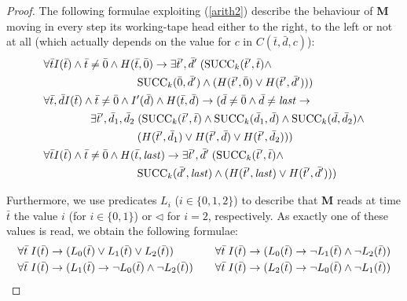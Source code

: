\documentclass{article}
\begin{document}
\begin{proof}
The following formulae exploiting (\ref{arith2}) describe the behaviour of \textbf{M} moving in every step its working-tape head either to the right, to the left or not at all (which actually depends on the value for $c$ in $C(\bar{t},\bar{d},c)$):
\begin{align}
& \forall \bar{t} I(\bar{t}) \wedge \bar{t} \neq \bar{0} \wedge H(\bar{t},\bar{0}) \rightarrow
\exists \bar{t}^\prime, \bar{d}^\prime \; ( \mathrm{SUCC}_k(\bar{t}^\prime,\bar{t}) \wedge \notag \\
& \hspace*{3cm} \mathrm{SUCC}_k(\bar{0},\bar{d}^\prime) \wedge ( H(\bar{t}^\prime,\bar{0}) \vee H(\bar{t}^\prime,\bar{d}^\prime) ) ) \notag \\
& \forall \bar{t}, \bar{d} I(\bar{t}) \wedge \bar{t} \neq \bar{0} \wedge I^\prime(\bar{d}) \wedge H(\bar{t},\bar{d}) \rightarrow ( \bar{d} \neq \bar{0} \wedge \bar{d} \neq \mathit{last} \rightarrow \notag \\
& \hspace*{1.5cm} \exists \bar{t}^\prime, \bar{d}_1 , \bar{d}_2 \; ( \mathrm{SUCC}_k(\bar{t}^\prime,\bar{t}) \wedge \mathrm{SUCC}_k(\bar{d}_1,\bar{d}) \wedge \mathrm{SUCC}_k(\bar{d},\bar{d}_2) \wedge \notag \\
& \hspace*{3cm}  ( H(\bar{t}^\prime,\bar{d}_1) \vee H(\bar{t}^\prime,\bar{d}) \vee H(\bar{t}^\prime,\bar{d}_2) ) ) \notag \\
& \forall \bar{t} I(\bar{t}) \wedge \bar{t} \neq \bar{0} \wedge H(\bar{t},\mathit{last}) \rightarrow
\exists \bar{t}^\prime, \bar{d}^\prime \; ( \mathrm{SUCC}_k(\bar{t}^\prime,\bar{t}) \wedge \notag \\
& \hspace*{3cm} \mathrm{SUCC}_k(\bar{d}^\prime,\mathit{last}) \wedge ( H(\bar{t}^\prime,\mathit{last}) \vee H(\bar{t}^\prime,\bar{d}^\prime) ) ) \label{eq-5}
\end{align}
    
Furthermore, we use predicates $L_i$ ($i \in \{ 0, 1, 2 \}$) to describe that \textbf{M} reads at time $\bar{t}$ the value $i$ (for $i \in \{ 0, 1 \}$) or $\triangleleft$ for $i=2$, respectively. As exactly one of these values is read, we obtain the following formulae:
\begin{alignat}{2}
& \forall \bar{t} \; I(\bar{t}) \rightarrow ( L_0(\bar{t}) \vee L_1(\bar{t}) \vee L_2(\bar{t}) ) \quad &
& \forall \bar{t} \; I(\bar{t}) \rightarrow ( L_0(\bar{t}) \rightarrow \neg L_1(\bar{t}) \wedge \neg L_2(\bar{t}) ) \notag \\
& \forall \bar{t} \; I(\bar{t}) \rightarrow ( L_1(\bar{t}) \rightarrow \neg L_0(\bar{t}) \wedge \neg L_2(\bar{t}) ) \quad &
& \forall \bar{t} \; I(\bar{t}) \rightarrow ( L_2(\bar{t}) \rightarrow \neg L_0(\bar{t}) \wedge \neg L_1(\bar{t}) ) \label{eq-6}
\end{alignat}


\end{proof}
\end{document}
